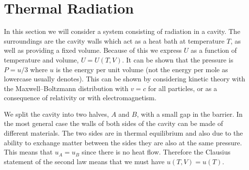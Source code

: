     \section{Thermal Radiation}
    In this section we will consider a system consisting of radiation in a cavity.
    The surroundings are the cavity walls which act as a heat bath at temperature \(T\), as well as providing a fixed volume.
    Because of this we express \(U\) as a function of temperature and volume, \(U = U(T, V)\).
    It can be shown that the pressure is \(P = u/3\) where \(u\) is the energy per unit volume (not the energy per mole as lowercase usually denotes).
    This can be shown by considering kinetic theory with the Maxwell--Boltzmann distribution with \(v = c\) for all particles, or as a consequence of relativity or with electromagnetism.
    
    We split the cavity into two halves, \(A\) and \(B\), with a small gap in the barrier.
    In the most general case the walls of both sides of the cavity can be made of different materials.
    The two sides are in thermal equilibrium and also due to the ability to exchange matter between the sides they are also at the same pressure.
    This means that \(u_A = u_B\) since there is no heat flow.
    Therefore the Clausius statement of the second law means that we must have \(u(T, V) = u(T)\).
    
